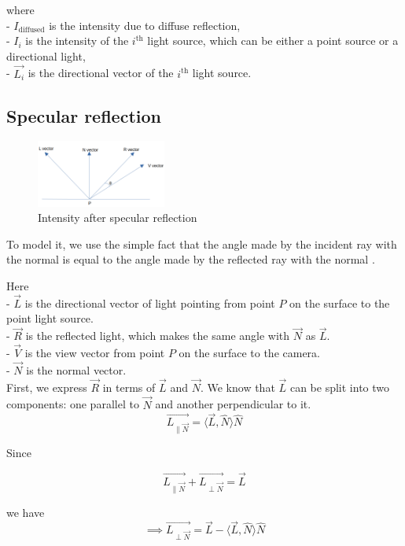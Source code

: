 \documentclass[conference]{IEEEtran}
\begin{document}
where\\
- $ I_{\text{diffused}} $ is the intensity due to diffuse reflection,\\
- $ I_i $ is the intensity of the $ i^{\text{th}} $ light source, which can be either a point source or a directional light,\\
- $ \vec{L_i} $ is the directional vector of the $ i^{\text{th}} $ light source.




\subsection{Specular reflection}

\begin{figure}[htbp]
    \centerline{\includegraphics[width=0.38\textwidth]{./figs/intensityspecular.png}}
    \caption{Intensity after specular reflection}

\end{figure}
To model it, we use the simple fact that the angle made by the incident ray with the normal is equal to the angle made by the reflected ray with the normal .

Here\\
- $\vec{L}$ is the directional vector of light pointing from point $P$ on the surface to the point light source.\\
- $\vec{R}$ is the reflected light, which makes the same angle with $\vec{N}$ as $\vec{L}$.\\
- $\vec{V}$ is the view vector from point $P$ on the surface to the camera.\\
- $\vec{N}$ is the normal vector.\\

First, we express $\vec{R}$ in terms of $\vec{L}$ and $\vec{N}$.
We know that $\vec{L}$ can be split into two components: one parallel to $\vec{N}$ and another perpendicular to it.
$$\vec{L_{\| \vec{N}}} = \langle \vec{L}, \hat{N} \rangle \hat{N}$$

Since 

$$\vec{L_{\| \vec{N}}} + \vec{L_{\perp \vec{N}}} = \vec{L}$$

we have
$$\implies \vec{L_{\perp \vec{N}}} = \vec{L} - \langle \vec{L}, \hat{N} \rangle \hat{N}$$
\end{document}
